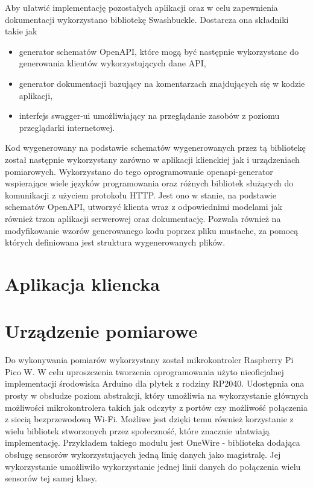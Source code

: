 Aby ułatwić implementację pozostałych aplikacji oraz w celu zapewnienia dokumentacji
wykorzystano bibliotekę Swashbuckle. Dostarcza ona składniki takie jak 
\begin{itemize}
  \item generator schematów OpenAPI, które mogą być następnie wykorzystane do generowania klientów
wykorzystujących dane API,
  \item generator dokumentacji bazujący na komentarzach znajdujących się w kodzie aplikacji,
  \item interfejs swagger-ui umożliwiający na przeglądanie zasobów z poziomu przeglądarki internetowej.
\end{itemize}
Kod wygenerowany na podstawie schematów wygenerowanych przez tą bibliotekę został następnie
wykorzystany zarówno w aplikacji klienckiej jak i urządzeniach pomiarowych.
Wykorzystano do tego oprogramowanie openapi-generator wspierające wiele języków
programowania oraz różnych bibliotek służących do komunikacji z użyciem protokołu HTTP.
Jest ono w stanie, na podstawie schematów OpenAPI, utworzyć klienta wraz z odpowiednimi
modelami jak również trzon aplikacji serwerowej oraz dokumentację. Pozwala również
na modyfikowanie wzorów generowanego kodu poprzez pliku mustache, za pomocą których
definiowana jest struktura wygenerowanych plików.


\section{Aplikacja kliencka}


\section{Urządzenie pomiarowe}
Do wykonywania pomiarów wykorzystany został mikrokontroler Raspberry Pi Pico W.
W celu uproszczenia tworzenia oprogramowania użyto nieoficjalnej implementacji
środowiska Arduino dla płytek z rodziny RP2040. Udostępnia ona prosty
w obsłudze poziom abstrakcji, który umożliwia na wykorzystanie głównych
możliwości mikrokontrolera takich jak odczyty z portów czy możliwość połączenia
z siecią bezprzewodową Wi-Fi. Możliwe jest dzięki temu również korzystanie z
wielu bibliotek stworzonych przez społeczność, które znacznie ułatwiają implementację.
Przykładem takiego modułu jest OneWire - biblioteka dodająca obsługę sensorów 
wykorzystujących jedną linię danych jako magistralę.
Jej wykorzystanie umożliwiło wykorzystanie jednej linii danych do połączenia wielu 
sensorów tej samej klasy.

